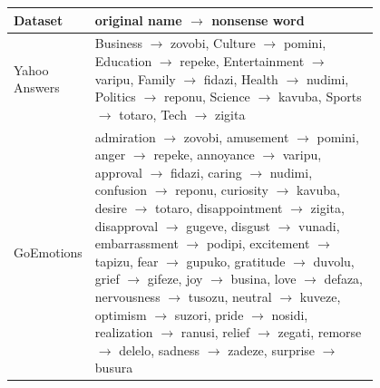 \begin{tabular}{lp{0.8\linewidth}}
\toprule
Dataset & original name $\to$ nonsense word \\
\midrule
Yahoo Answers & Business $\to$ zovobi, Culture $\to$ pomini, Education $\to$ repeke, Entertainment $\to$ varipu, Family $\to$ fidazi, Health $\to$ nudimi, Politics $\to$ reponu, Science $\to$ kavuba, Sports $\to$ totaro, Tech $\to$ zigita \\
GoEmotions & admiration $\to$ zovobi, amusement $\to$ pomini, anger $\to$ repeke, annoyance $\to$ varipu, approval $\to$ fidazi, caring $\to$ nudimi, confusion $\to$ reponu, curiosity $\to$ kavuba, desire $\to$ totaro, disappointment $\to$ zigita, disapproval $\to$ gugeve, disgust $\to$ vunadi, embarrassment $\to$ podipi, excitement $\to$ tapizu, fear $\to$ gupuko, gratitude $\to$ duvolu, grief $\to$ gifeze, joy $\to$ busina, love $\to$ defaza, nervousness $\to$ tusozu, neutral $\to$ kuveze, optimism $\to$ suzori, pride $\to$ nosidi, realization $\to$ ranusi, relief $\to$ zegati, remorse $\to$ delelo, sadness $\to$ zadeze, surprise $\to$ busura \\
\bottomrule
\end{tabular}
